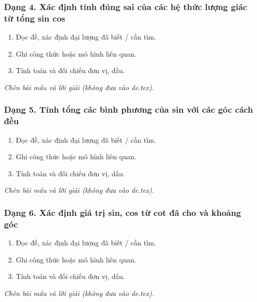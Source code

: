 \subsubsection{Dạng 4. Xác định tính đúng sai của các hệ thức lượng giác từ tổng sin cos}
\begin{phuongphap}
\begin{enumerate}
\item Đọc đề, xác định đại lượng đã biết / cần tìm.
\item Ghi công thức hoặc mô hình liên quan.
\item Tính toán và đối chiếu đơn vị, dấu.
\end{enumerate}
\end{phuongphap}
\begin{vidumau}
\textit{Chèn bài mẫu và lời giải (không đưa vào de.tex).}
\end{vidumau}

\subsubsection{Dạng 5. Tính tổng các bình phương của sin với các góc cách đều}
\begin{phuongphap}
\begin{enumerate}
\item Đọc đề, xác định đại lượng đã biết / cần tìm.
\item Ghi công thức hoặc mô hình liên quan.
\item Tính toán và đối chiếu đơn vị, dấu.
\end{enumerate}
\end{phuongphap}
\begin{vidumau}
\textit{Chèn bài mẫu và lời giải (không đưa vào de.tex).}
\end{vidumau}

\subsubsection{Dạng 6. Xác định giá trị sin, cos từ cot đã cho và khoảng góc}
\begin{phuongphap}
\begin{enumerate}
\item Đọc đề, xác định đại lượng đã biết / cần tìm.
\item Ghi công thức hoặc mô hình liên quan.
\item Tính toán và đối chiếu đơn vị, dấu.
\end{enumerate}
\end{phuongphap}
\begin{vidumau}
\textit{Chèn bài mẫu và lời giải (không đưa vào de.tex).}
\end{vidumau}

